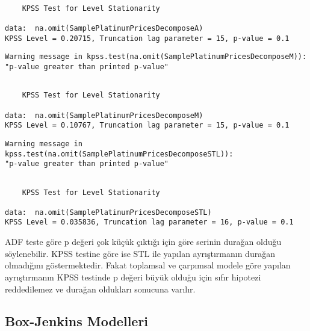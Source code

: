 \documentclass[11pt]{article}
\begin{document}
    
    \begin{verbatim}

	KPSS Test for Level Stationarity

data:  na.omit(SamplePlatinumPricesDecomposeA)
KPSS Level = 0.20715, Truncation lag parameter = 15, p-value = 0.1

    \end{verbatim}

    
    \begin{Verbatim}[commandchars=\\\{\}]
Warning message in kpss.test(na.omit(SamplePlatinumPricesDecomposeM)):
"p-value greater than printed p-value"
    \end{Verbatim}

    
    \begin{verbatim}

	KPSS Test for Level Stationarity

data:  na.omit(SamplePlatinumPricesDecomposeM)
KPSS Level = 0.10767, Truncation lag parameter = 15, p-value = 0.1

    \end{verbatim}

    
    \begin{Verbatim}[commandchars=\\\{\}]
Warning message in kpss.test(na.omit(SamplePlatinumPricesDecomposeSTL)):
"p-value greater than printed p-value"
    \end{Verbatim}

    
    \begin{verbatim}

	KPSS Test for Level Stationarity

data:  na.omit(SamplePlatinumPricesDecomposeSTL)
KPSS Level = 0.035836, Truncation lag parameter = 16, p-value = 0.1

    \end{verbatim}

    
    ADF teste göre p değeri çok küçük çıktığı için göre serinin durağan
olduğu söylenebilir. KPSS testine göre ise STL ile yapılan ayrıştırmanın
durağan olmadığını göstermektedir. Fakat toplamsal ve çarpımsal modele
göre yapılan ayrıştırmanın KPSS testinde p değeri büyük olduğu için
sıfır hipotezi reddedilemez ve durağan oldukları sonucuna varılır.

\subsection{Box-Jenkins Modelleri}\label{box-jenkins-modelleri}
\end{document}
